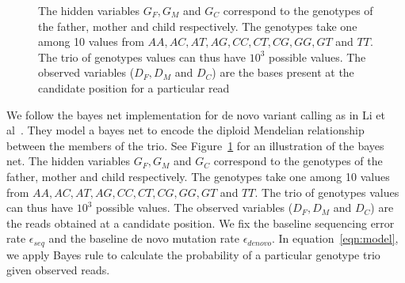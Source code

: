 \documentclass{article}
\begin{document}
\begin{figure}
\centering
{}
\caption{The hidden variables $G_{F}, G_{M}$ and $G_{C}$ correspond to the genotypes of the father, mother and child respectively. The genotypes take one among 10 values from $AA, AC, AT, AG, CC, CT, CG, GG, GT$ and $TT$. The trio of genotypes values can thus have $10^3$ possible values. The observed variables ($D_F, D_M$ and $D_C$) are the bases present at the candidate position for a particular read }
\label{fig:bayesnet}
\end{figure}

\vspace{5mm}
We follow the bayes net implementation for de novo variant calling as in Li et al~\cite{Li2012}. They model a bayes net to encode the diploid Mendelian relationship between the members of the trio. See Figure~\ref{fig:bayesnet} for an illustration of the bayes net. The hidden variables $G_{F}, G_{M}$ and $G_{C}$ correspond to the genotypes of the father, mother and child respectively. The genotypes take one among 10 values from $AA, AC, AT, AG, CC, CT, CG, GG, GT$ and $TT$. The trio of genotypes values can thus have $10^3$ possible values. The observed variables ($D_F, D_M$ and $D_C$) are the reads obtained at a candidate position. We fix the baseline sequencing error rate $\epsilon_{seq}$ and the baseline de novo mutation rate $\epsilon_{denovo}$. In equation~\ref{eqn:model}, we apply Bayes rule to calculate the probability of a particular genotype trio given observed reads.
\end{document}
